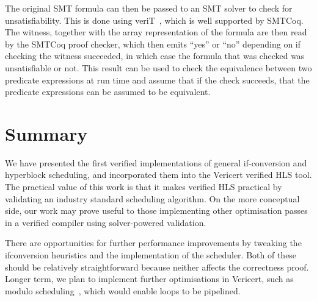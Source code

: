 {

The original SMT formula can then be passed to an SMT solver to check for
unsatisfiability.  This is done using veriT~\cite{bouton09}, which is well
supported by SMTCoq.  The witness, together with the array representation of the
formula are then read by the SMTCoq proof checker, which then emits
\enquote{yes} or \enquote{no} depending on if checking the witness succeeded, in
which case the formula that was checked was unsatisfiable or not.  This result
can be used to check the equivalence between two predicate expressions at run
time and assume that if the check succeeds, that the predicate expressions can
be assumed to be equivalent.

\section{Summary}

We have presented the first verified implementations of general if-conversion
and hyperblock scheduling, and incorporated them into the Vericert verified HLS
tool. The practical value of this work is that it makes verified \gls{HLS}
practical by validating an industry standard scheduling algorithm. On the more
conceptual side, our work may prove useful to those implementing other
optimisation passes in a verified compiler using solver-powered validation.

There are opportunities for further performance improvements by tweaking the
if\?conversion heuristics and the implementation of the scheduler. Both of these
should be relatively straightforward because neither affects the correctness
proof. Longer term, we plan to implement further optimisations in Vericert, such
as modulo scheduling~\cite{zhang13_sdc}, which would enable loops to be
pipelined.


}
